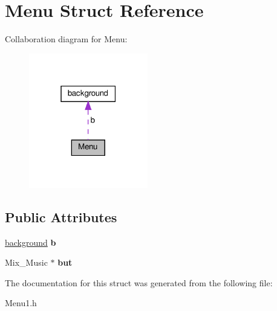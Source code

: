 \hypertarget{structMenu}{}\section{Menu Struct Reference}
\label{structMenu}


Collaboration diagram for Menu\+:
\nopagebreak
\begin{figure}[H]
\begin{center}
\leavevmode
\includegraphics[width=147pt]{structMenu__coll__graph}
\end{center}
\end{figure}
\subsection*{Public Attributes}
\begin{DoxyCompactItemize}
\item 
\mbox{\label{structMenu_ace635e2f2ed8aa326e894c8d879148d6}} 
\hyperlink{structbackground}{background} {\bfseries b}
\item 
\mbox{\label{structMenu_ae29eb7a1c451ac7d1977a09e0f0f8d65}} 
Mix\+\_\+\+Music $\ast$ {\bfseries but}
\end{DoxyCompactItemize}


The documentation for this struct was generated from the following file\+:\begin{DoxyCompactItemize}
\item 
Menu1.\+h\end{DoxyCompactItemize}
